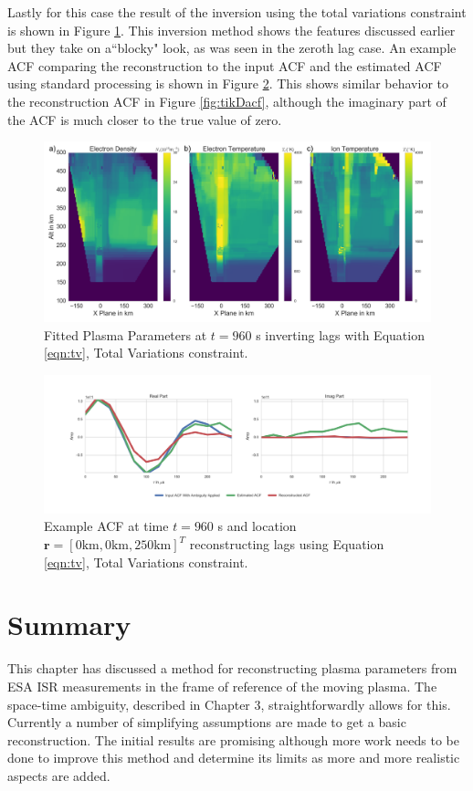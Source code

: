 Lastly for this case the result of the inversion using the total variations constraint is shown in Figure \ref{fig:tv}. This inversion method shows the features discussed earlier but they take on a``blocky" look, as was seen in the zeroth lag case. An example ACF comparing the reconstruction to the input ACF and the estimated ACF using standard processing is shown in Figure \ref{fig:tvacf}. This shows similar behavior to the reconstruction ACF in Figure \ref{fig:tikDacf}, although the imaginary part of the ACF is much closer to the true value of zero.
\begin{figure}[!ht]
\centering
\includegraphics[width=6in]{tvfitted}
\caption{Fitted Plasma Parameters at $t=960$ s inverting lags with Equation \ref{eqn:tv}, Total Variations constraint.}
\label{fig:tv}
\end{figure}

\begin{figure}[!ht]
\centering
\includegraphics[width=6in]{acftv}
\caption{Example ACF at time $t=960$ s and location $\mathbf{r}=[0  \text{km},0  \text{km},250 \text{km}]^T$ reconstructing lags using Equation \ref{eqn:tv}, Total Variations constraint. }
\label{fig:tvacf}
\end{figure}

\section{Summary}

This chapter has discussed a method for reconstructing plasma parameters from ESA ISR measurements in the frame of reference of the moving plasma. The space-time ambiguity, described in Chapter 3, straightforwardly allows for this. Currently a number of simplifying assumptions are made to get a basic reconstruction. The initial results are promising although more work needs to be done to improve this method and determine its limits as more and more realistic aspects are added.